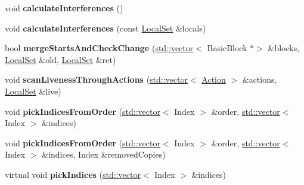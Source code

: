 \begin{DoxyCompactItemize}
\item 
\mbox{\label{structwasm_1_1_coalesce_locals_a68db149a398fe4b38c1fd0c9b3ef4f4b}} 
void {\bfseries calculate\+Interferences} ()
\item 
\mbox{\label{structwasm_1_1_coalesce_locals_a3b1c76e423033e96c0a2c0cdfe51cfb0}} 
void {\bfseries calculate\+Interferences} (const \mbox{\hyperlink{structwasm_1_1_local_set}{Local\+Set}} \&locals)
\item 
\mbox{\label{structwasm_1_1_coalesce_locals_a84fc8b713a11d30d5adaf5e95b3ee51f}} 
bool {\bfseries merge\+Starts\+And\+Check\+Change} (\mbox{\hyperlink{classstd_1_1vector}{std\+::vector}}$<$ Basic\+Block $\ast$$>$ \&blocks, \mbox{\hyperlink{structwasm_1_1_local_set}{Local\+Set}} \&old, \mbox{\hyperlink{structwasm_1_1_local_set}{Local\+Set}} \&ret)
\item 
\mbox{\label{structwasm_1_1_coalesce_locals_a5bf5deb661acb744d82ba4d0795d9eba}} 
void {\bfseries scan\+Liveness\+Through\+Actions} (\mbox{\hyperlink{classstd_1_1vector}{std\+::vector}}$<$ \mbox{\hyperlink{structwasm_1_1_action}{Action}} $>$ \&actions, \mbox{\hyperlink{structwasm_1_1_local_set}{Local\+Set}} \&live)
\item 
\mbox{\label{structwasm_1_1_coalesce_locals_a8afd5a0394b11116c94239a713424839}} 
void {\bfseries pick\+Indices\+From\+Order} (\mbox{\hyperlink{classstd_1_1vector}{std\+::vector}}$<$ Index $>$ \&order, \mbox{\hyperlink{classstd_1_1vector}{std\+::vector}}$<$ Index $>$ \&indices)
\item 
\mbox{\label{structwasm_1_1_coalesce_locals_adf84bb24f2bc2bf76e919fc4f2110d90}} 
void {\bfseries pick\+Indices\+From\+Order} (\mbox{\hyperlink{classstd_1_1vector}{std\+::vector}}$<$ Index $>$ \&order, \mbox{\hyperlink{classstd_1_1vector}{std\+::vector}}$<$ Index $>$ \&indices, Index \&removed\+Copies)
\item 
\mbox{\label{structwasm_1_1_coalesce_locals_ad707b55e98f4706b80dd80069fdf2654}} 
virtual void {\bfseries pick\+Indices} (\mbox{\hyperlink{classstd_1_1vector}{std\+::vector}}$<$ Index $>$ \&indices)
$$
\end{DoxyCompactItemize}
